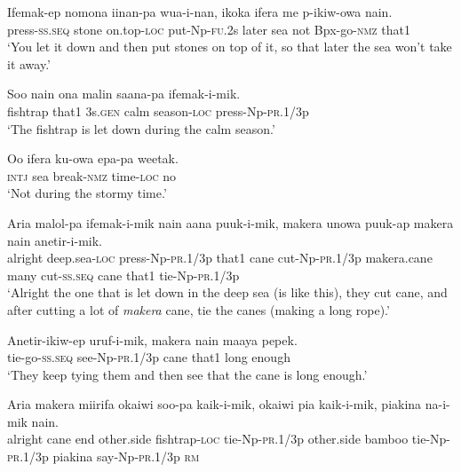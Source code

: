 \ea\label{ex:a:x9}
\gll  Ifemak-ep  nomona  iinan-pa  wua-i-nan,  ikoka  ifera  me  p-ikiw-owa  nain. \\
press-\textsc{ss.seq}  stone  on.top-\textsc{loc}  put-Np-\textsc{fu}.2s  later  sea    not  Bpx-go-\textsc{nmz}  that1 \\


\glt ‘You let it down and then put stones on top of it, so that later the sea won’t take it away.’ \\
\z


\ea\label{ex:a:x10}
\gll  Soo  nain  ona  malin  saana-pa  ifemak-i-mik. \\
fishtrap  that1  3s.\textsc{gen}  calm  season-\textsc{loc}  press-Np-\textsc{pr}.1/3p \\
\glt ‘The fishtrap is let down during the calm season.’ \\
\z


\ea\label{ex:a:x11}
\gll  Oo  ifera  ku-owa  epa-pa  weetak. \\
\textsc{intj}  sea  break-\textsc{nmz}  time-\textsc{loc}  no \\
\glt ‘Not during the stormy time.’ \\
\z


\ea\label{ex:a:x12}
\gll  Aria  malol-pa  ifemak-i-mik  nain  aana        puuk-i-mik,  makera  unowa  puuk-ap             makera  nain  anetir-i-mik. \\
alright  deep.sea-\textsc{loc}  press-Np-\textsc{pr}.1/3p  that1  cane  cut-Np-\textsc{pr}.1/3p  makera.cane  many  cut-\textsc{ss.seq}   cane  that1  tie-Np-\textsc{pr}.1/3p \\




\glt ‘Alright the one that is let down in the deep sea (is like this), they cut cane, and after cutting a lot of \textit{makera} cane, tie the canes (making a long rope).’ \\
\z


\ea\label{ex:a:x13}
\gll  Anetir-ikiw-ep  uruf-i-mik,  makera  nain  maaya  pepek. \\
tie-go-\textsc{ss.seq}  see-Np-\textsc{pr}.1/3p  cane  that1  long  enough \\
\glt ‘They keep tying them and then see that the cane is long enough.’ \\
\z


\ea\label{ex:a:x14}
\gll  Aria  makera  miirifa  okaiwi  soo-pa  kaik-i-mik,       okaiwi  pia  kaik-i-mik,  piakina  na-i-mik  nain. \\
alright  cane  end  other.side  fishtrap-\textsc{loc}  tie-Np-\textsc{pr}.1/3p   other.side  bamboo  tie{}-Np-\textsc{pr}.1/3p  piakina  say-Np-\textsc{pr}.1/3p  \textsc{rm} \\



